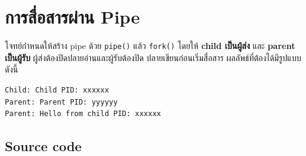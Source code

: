 \documentclass[a4paper,12pt]{article}
\newcommand{\code}[1]{\texttt{#1}}
\begin{document}
\section{การสื่อสารผ่าน Pipe}

โจทย์กำหนดให้สร้าง pipe ด้วย \code{pipe()} แล้ว \code{fork()} โดยให้ \textbf{child
เป็นผู้ส่ง} และ \textbf{parent เป็นผู้รับ} ผู้ส่งต้องปิดปลายอ่านและผู้รับต้องปิด
ปลายเขียนก่อนเริ่มสื่อสาร ผลลัพธ์ที่ต้องได้มีรูปแบบดังนี้

\begin{lstlisting}[style=terminal]
Child: Child PID: xxxxxx
Parent: Parent PID: yyyyyy
Parent: Hello from child PID: xxxxxx
\end{lstlisting}

\subsection{Source code}
\end{document}
